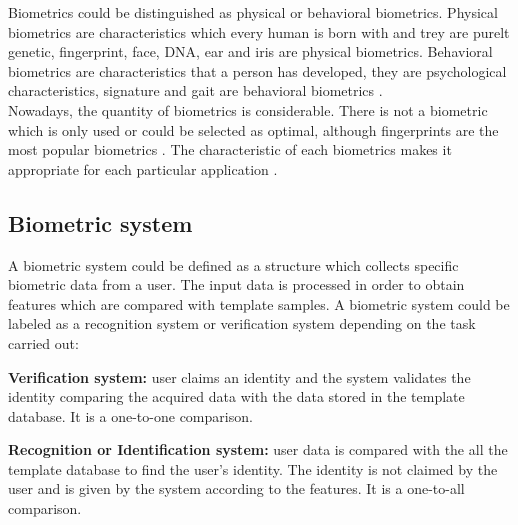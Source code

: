 Biometrics could be distinguished as physical or behavioral biometrics. Physical biometrics are characteristics which every human is born with and trey are purelt genetic, fingerprint, face, DNA, ear and iris are physical biometrics. Behavioral biometrics are characteristics that a person has developed, they are  psychological characteristics, signature and gait are behavioral biometrics \cite{biometrics_beha}.\\

Nowadays, the quantity of biometrics is considerable. There is not a biometric which is only used or could be selected as optimal, although fingerprints are the most popular biometrics \cite{2d_3d_face}. The characteristic of each biometrics makes it appropriate for each particular application \cite{Intro_biometrics}.%


\subsection{Biometric system}
A biometric system could be defined as a structure which collects specific biometric data from a user. The input data is processed in order to obtain features which are compared with template samples. A biometric system could be labeled as a recognition system or verification system depending on the task carried out\cite{Intro_biometrics2}:
\begin{description}[itemsep=2pt,topsep=8pt,parsep=0pt,partopsep=20pt]
\item \textbf{Verification system:} user claims an identity and the system validates the identity comparing the acquired data with the data stored in the template database. It is a one-to-one comparison.
\item \textbf{Recognition or Identification system:} user data is compared with the all the template database to find the user's identity. The identity is not claimed by the user and is given by the system according to the features. It is a one-to-all comparison.
\end{description}

